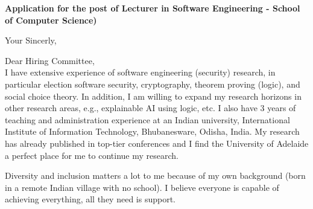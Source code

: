 \documentclass[11pt,a4paper,roman]{moderncv}
\begin{document}
\date{}
\opening{\textbf{Application for the post of Lecturer  in 
    Software Engineering - School of Computer Science)}}
\closing{Your Sincerly, \vspace{-1em}}



\makelettertitle



Dear Hiring Committee, 
\\
\vspace{1em}
I have extensive experience of software engineering (security) research, in particular 
election software security, cryptography, theorem proving (logic), and social choice theory. 
In addition, I am willing to expand my research horizons in other research 
areas, e.g., explainable 
AI using logic, etc. I also have 3 years of teaching and administration experience 
at an Indian university, International Institute of Information Technology, 
Bhubanesware, Odisha, India. My research has already published in 
top-tier conferences and I find the University of Adelaide a perfect 
place for me to continue my research. 

Diversity and inclusion matters a lot to me because of my own background (born in 
a remote Indian village with no school). I believe everyone is capable of 
achieving everything, all they need is support. 

\vspace{0.5cm}


\makeletterclosing
\end{document}
